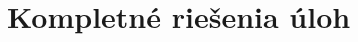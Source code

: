 \thispagestyle{empty}
\chapter{Kompletné riešenia úloh}
\renewcommand*{\thepage}{B-\arabic{page}}








